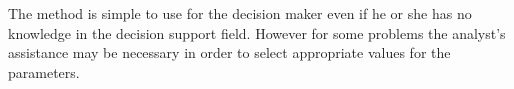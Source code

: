 The method is simple to use for the decision maker even if he or she has no
knowledge in the decision support field. However for some problems the
analyst's assistance may be necessary in order to select appropriate values
for the parameters.

